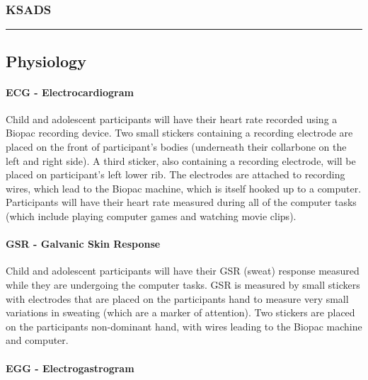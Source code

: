 \documentclass[
]{book}
\begin{document}
\hypertarget{ksads}{%
\subsubsection{KSADS}\label{ksads}}

\begin{center}\rule{0.5\linewidth}{0.5pt}\end{center}

\hypertarget{physiology}{%
\subsection{Physiology}\label{physiology}}

\hypertarget{ecg---electrocardiogram}{%
\paragraph{ECG - Electrocardiogram}\label{ecg---electrocardiogram}}

Child and adolescent participants will have their heart rate recorded using a Biopac recording device. Two small stickers containing a recording electrode are placed on the front of participant's bodies (underneath their collarbone on the left and right side). A third sticker, also containing a recording electrode, will be placed on participant's left lower rib. The electrodes are attached to recording wires, which lead to the Biopac machine, which is itself hooked up to a computer. Participants will have their heart rate measured during all of the computer tasks (which include playing computer games and watching movie clips).

\hypertarget{gsr---galvanic-skin-response}{%
\paragraph{GSR - Galvanic Skin Response}\label{gsr---galvanic-skin-response}}

Child and adolescent participants will have their GSR (sweat) response measured while they are undergoing the computer tasks. GSR is measured by small stickers with electrodes that are placed on the participants hand to measure very small variations in sweating (which are a marker of attention). Two stickers are placed on the participants non-dominant hand, with wires leading to the Biopac machine and computer.

\hypertarget{egg---electrogastrogram}{%
\paragraph{EGG - Electrogastrogram}\label{egg---electrogastrogram}}
\end{document}
